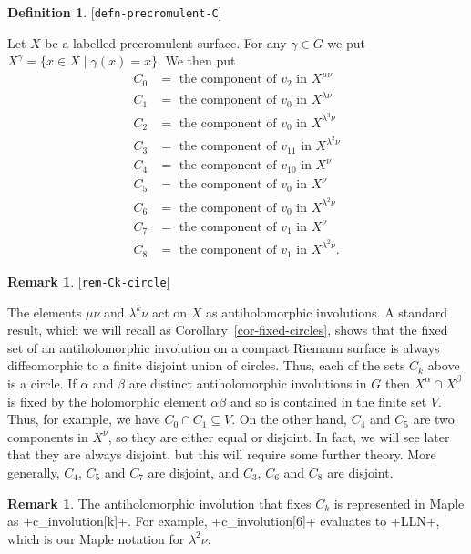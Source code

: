 \documentclass[reqno]{amsart}
\newcommand{\lbl}[1]{\label{#1}\textup{[\texttt{#1}]}\par}
\newcommand{\lbl}{\label}
\newcommand{\al}        {\alpha}
\newcommand{\bt}        {\beta}
\newcommand{\gm}        {\gamma}
\newcommand{\lm}        {\lambda}
\newcommand{\st}        {\;|\;}
\newcommand{\sse}       {\subseteq}
\renewcommand{\:}{\colon}
\theoremstyle{definition}
\newtheorem{remark}[theorem]{Remark}
\newtheorem{definition}[theorem]{Definition}
\begin{document}
\begin{definition}\lbl{defn-precromulent-C}
 Let $X$ be a labelled precromulent surface.  For any $\gm\in G$ we
 put $X^\gm=\{x\in X\st \gm(x)=x\}$.  We then put
 \begin{align*}
  C_0 &= \text{ the component of $v_2$ in } X^{\mu\nu} \\
  C_1 &= \text{ the component of $v_0$ in } X^{\lm\nu} \\
  C_2 &= \text{ the component of $v_0$ in } X^{\lm^3\nu} \\
  C_3 &= \text{ the component of $v_{11}$ in } X^{\lm^2\nu} \\
  C_4 &= \text{ the component of $v_{10}$ in } X^\nu \\
  C_5 &= \text{ the component of $v_0$ in } X^\nu \\
  C_6 &= \text{ the component of $v_0$ in } X^{\lm^2\nu} \\
  C_7 &= \text{ the component of $v_1$ in } X^\nu \\
  C_8 &= \text{ the component of $v_1$ in } X^{\lm^2\nu}.
 \end{align*}
\end{definition}
\begin{remark}\lbl{rem-Ck-circle}
 The elements $\mu\nu$ and $\lm^k\nu$ act on $X$ as antiholomorphic
 involutions.  A standard result, which we will recall as
 Corollary~\ref{cor-fixed-circles}, shows that the fixed set of an
 antiholomorphic involution on a compact Riemann surface is always
 diffeomorphic to a finite disjoint union of circles.  Thus, each of
 the sets $C_k$ above is a circle.  If $\al$ and $\bt$ are distinct
 antiholomorphic involutions in $G$ then $X^\al\cap X^\bt$ is fixed by
 the holomorphic element $\al\bt$ and so is contained in the finite
 set $V$.  Thus, for example, we have $C_0\cap C_1\sse V$.  On the
 other hand, $C_4$ and $C_5$ are two components in $X^\nu$, so they
 are either equal or disjoint.  In fact, we will see later that they
 are always disjoint, but this will require some further theory.
 More generally, $C_4$, $C_5$ and $C_7$ are disjoint, and $C_3$, $C_6$
 and $C_8$ are disjoint.
\end{remark}
\begin{remark}
 The antiholomorphic involution that fixes $C_k$ is represented in
 Maple as \mcode+c_involution[k]+.  For example, \mcode+c_involution[6]+
 evaluates to \mcode+LLN+, which is our Maple notation for $\lm^2\nu$.
\end{remark}
\end{document}
